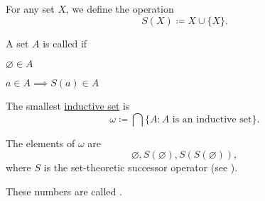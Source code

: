 \begin{definition}\label{def:ordinal_successor_operator}
  For any set \( X \), we define the  operation
  \begin{equation*}
    S(X) \coloneqq X \cup \{ X \}.
  \end{equation*}
\end{definition}

\begin{definition}\label{def:inductive_set}
  A set \( A \) is called  if
  \begin{thmenum}
    \item \( \varnothing \in A \)
    \item \( a \in A \implies S(a) \in A \)
  \end{thmenum}
\end{definition}

\begin{definition}\label{def:smallest_inductive_set}
  The smallest \hyperref[def:inductive_set]{inductive set} is
  \begin{equation*}
    \omega \coloneqq \bigcap \{ A \colon A \text{ is an inductive set} \}.
  \end{equation*}

  The elements of \( \omega \) are
  \begin{equation*}
    \varnothing, S(\varnothing), S(S(\varnothing)),
  \end{equation*}
  where \( S \) is the set-theoretic successor operator (see ).

  These numbers are called .
\end{definition}
